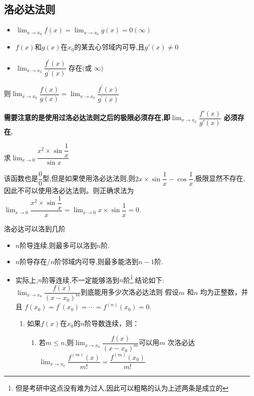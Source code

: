 \documentclass[12pt, a4paper, oneside, UTF8]{ctexbook}
\begin{document}
\begin{sloppypar}
    \subsection{洛必达法则}
    \begin{defn}{}{}
        \begin{itemize}
            \item $\lim_{x\to x_0}f(x)=\lim_{x\to x_0}g(x)=0(\infty)$
            \item $f(x)$和$g(x)$在$x_0$的某去心邻域内可导,且$g'(x) \neq 0$
            \item $\lim_{x\to x_0}\dfrac{f^{\prime}(x)}{g^{\prime}(x)}\text{ 存在(或 }\infty)$
        \end{itemize}
        则$\lim_{x\to x_{0}}\dfrac{f(x)}{g(x)}=\lim_{x\to x_{0}}\dfrac{f^{'}(x)}{g^{'}(x)}$
    \end{defn}
    \textbf{需要注意的是使用过洛必达法则之后的极限必须存在,即$\lim _{x \to x_0}\dfrac{f'(x)}{g'(x)}$ 必须存在.}
    \begin{problem}
    求$\lim _{x \to 0}\dfrac{x^2 \times \sin \dfrac{1}{x}}{\sin x}$
    \end{problem}
    \begin{solution}
        该函数也是$\dfrac{0}{0}$型,但是如果使用洛必达法则,则$2x \times \sin \dfrac{1}{x}-\cos \dfrac{1}{x}$,极限显然不存在,因此不可以使用洛必达法则。则正确求法为$\lim _{x\to 0}\dfrac{x^2\times \sin \dfrac{1}{x}}{x}=\lim_{x\to 0}x\times\sin\dfrac{1}{x}=0$.
    \end{solution}
    \begin{criterion}{洛必达可以洛到几阶}{}
        \begin{itemize}
            \item $n$阶导连续,则最多可以洛到$n$阶.
            \item $n$阶导存在/$n$阶邻域内可导,则最多能洛到$n-1$阶.
            \item 实际上,$n$阶等连续,不一定能够洛到$n$阶\footnote{但是考研中这点没有难为过人,因此可以粗略的认为上述两条是成立的}.结论如下:\\
            $\lim_{x\to x_0}\dfrac{f(x)}{\left(x-x_0\right)^m}$到底能用多少次洛必达法则
            假设$m$ 和$n$ 均为正整数，并且 $f(x_0)=f^{\prime}(x_0)=\cdots=f^{(n)}(x_0)=0.$ 
            \begin{enumerate}
                \item 如果$f(x)$在$x_0$的$n$阶导数连续，则：
                    \begin{enumerate}
                        \item 若$m{\leqslant}n$,则$\lim_{x\to x_0}\dfrac{f(x)}{\left(x-x_0\right)^m}$可以用$m$ 次洛必达$\lim_{x\to x_0}\dfrac{f^{(m)}\left(x\right)}{m!}=\dfrac{f^{(m)}\left(x_0\right)}{m!}$

\end{enumerate}
\end{enumerate}
\end{itemize}
\end{criterion}
\end{sloppypar}
\end{document}
